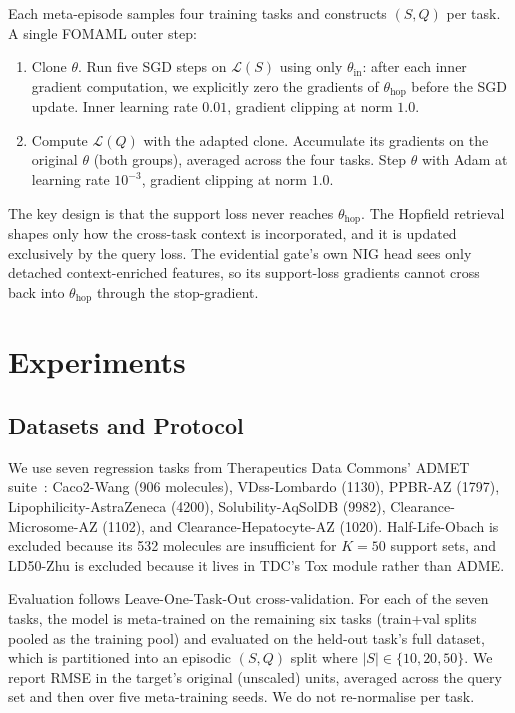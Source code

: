 \documentclass{article}
\theoremstyle{plain}
\theoremstyle{definition}
\theoremstyle{remark}
\begin{document}
Each meta-episode samples four training tasks and constructs $(S,Q)$ per task. A single FOMAML outer step:
\begin{enumerate}
    \item Clone $\theta$. Run five SGD steps on $\mathcal{L}(S)$ using only $\theta_{\text{in}}$: after each inner gradient computation, we explicitly zero the gradients of $\theta_{\text{hop}}$ before the SGD update. Inner learning rate $0.01$, gradient clipping at norm $1.0$.
    \item Compute $\mathcal{L}(Q)$ with the adapted clone. Accumulate its gradients on the original $\theta$ (both groups), averaged across the four tasks. Step $\theta$ with Adam at learning rate $10^{-3}$, gradient clipping at norm $1.0$.
\end{enumerate}

The key design is that the support loss never reaches $\theta_{\text{hop}}$. The Hopfield retrieval shapes only how the cross-task context is incorporated, and it is updated exclusively by the query loss. The evidential gate's own NIG head sees only detached context-enriched features, so its support-loss gradients cannot cross back into $\theta_{\text{hop}}$ through the stop-gradient.

\section{Experiments}
\label{sec:experiments}

\subsection{Datasets and Protocol}

We use seven regression tasks from Therapeutics Data Commons' ADMET suite~\citep{huang2021therapeutics}: Caco2-Wang (906 molecules), VDss-Lombardo (1130), PPBR-AZ (1797), Lipophilicity-AstraZeneca (4200), Solubility-AqSolDB (9982), Clearance-Microsome-AZ (1102), and Clearance-Hepatocyte-AZ (1020). Half-Life-Obach is excluded because its 532 molecules are insufficient for $K\!=\!50$ support sets, and LD50-Zhu is excluded because it lives in TDC's Tox module rather than ADME.

Evaluation follows Leave-One-Task-Out cross-validation. For each of the seven tasks, the model is meta-trained on the remaining six tasks (train+val splits pooled as the training pool) and evaluated on the held-out task's full dataset, which is partitioned into an episodic $(S,Q)$ split where $|S|\in\{10,20,50\}$. We report RMSE in the target's original (unscaled) units, averaged across the query set and then over five meta-training seeds. We do not re-normalise per task.
\end{document}
